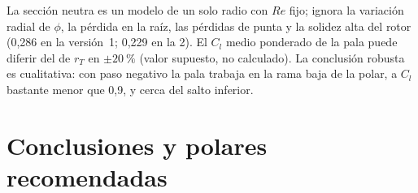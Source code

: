 \begin{nota}
La sección neutra es un modelo de un solo radio con $Re$ fijo; ignora la variación radial
de $\phi$, la pérdida en la raíz, las pérdidas de punta y la solidez alta del rotor
(0,286 en la versión~1; 0,229 en la 2). El $C_l$ medio ponderado de la pala puede diferir del de $r_T$ en
$\pm\SI{20}{\percent}$ (valor supuesto, no calculado). La conclusión robusta es
cualitativa: con paso negativo la pala trabaja en la rama baja de la polar, a $C_l$
bastante menor que 0,9, y cerca del salto inferior.
\end{nota}

\section{Conclusiones y polares recomendadas}\label{sec:polares-concl}

